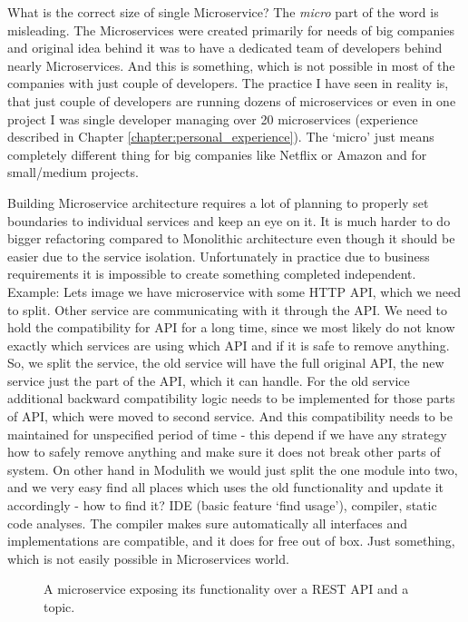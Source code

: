 What is the correct size of single Microservice? The \textit{micro} part of the word is misleading. The Microservices were created primarily for needs of big companies and original idea behind it was to have a dedicated team of developers behind nearly Microservices. And this is something, which is not possible in most of the companies with just couple of developers. The practice I have seen in reality is, that just couple of developers are running dozens of microservices or even in one project I was single developer managing over 20 microservices (experience described in Chapter \ref{chapter:personal_experience}). The `micro' just means completely different thing for big companies like Netflix or Amazon and for small/medium projects.

Building Microservice architecture requires a lot of planning to properly set boundaries to individual services and keep an eye on it. It is much harder to do bigger refactoring compared to Monolithic architecture even though it should be easier due to the service isolation. Unfortunately in practice due to business requirements it is impossible to create something completed independent. Example: Lets image we have microservice with some HTTP API, which we need to split. Other service are communicating with it through the API. We need to hold the compatibility for API for a long time, since we most likely do not know exactly which services are using which API and if it is safe to remove anything. So, we split the service, the old service will have the full original API, the new service just the part of the API, which it can handle. For the old service additional backward compatibility logic needs to be implemented for those parts of API, which were moved to second service. And this compatibility needs to be maintained for unspecified period of time - this depend if we have any strategy how to safely remove anything and make sure it does not break other parts of system. On other hand in Modulith we would just split the one module into two, and we very easy find all places which uses the old functionality and update it accordingly - how to find it? IDE (basic feature `find usage'), compiler, static code analyses. The compiler makes sure automatically all interfaces and implementations are compatible, and it does for free out of box. Just something, which is not easily possible in Microservices world.


\begin{figure}
    \centering
    
    \caption{A microservice exposing its functionality over a REST API and a topic. \cite{BUILDING_MS_WHAT_ARE}\label{img:microservices_basic}}
\end{figure}



